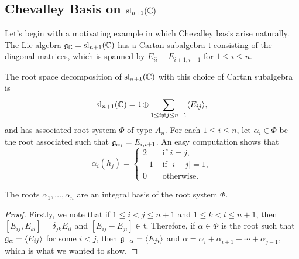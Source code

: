 \iffalse\begin{theorem}[Chevalley, 1955]
    Let $\fg_\CC$ be a complex simple Lie algebra. Then $\fg_\CC$ has a Chevalley basis. Moreover, the structure constants of any Chevalley basis are integral.
\end{theorem}\fi












\subsection{Chevalley Basis on \texorpdfstring{$\mathrm{sl}_{n+1}(\mathbb{C})$}{PDFstring}}\label{sec:chevbasis_sl}

Let's begin with a motivating example in which Chevalley basis arise naturally. The Lie algebra $\mathfrak{g}_{\mathbb{C}}=\mathrm{sl}_{n+1}(\mathbb{C})$ has a Cartan subalgebra $\mathfrak{t}$ consisting of the diagonal matrices, which is spanned by $E_{ii}-E_{i+1,i+1}$ for $1\leq i\leq n$. %

The root space decomposition of $\mathrm{sl}_{n+1}(\mathbb{C})$ with this choice of Cartan subalgebra is 
$$\mathrm{sl}_{n+1}(\mathbb{C})=\mathfrak{t}\oplus\sum_{1\leq i\neq j\leq n+1}\langle E_{ij}\rangle,$$
and has associated root system $\Phi$ of type $A_n$. For each $1\leq i\leq n$, let $\alpha_i\in\Phi$ be the root associated such that $\mathfrak{g}_{\alpha_i}=E_{i,i+1}$. An easy computation shows that 
$$\alpha_i(h_j)=\begin{cases}
    2 & \text{ if } i=j,\\
    -1 & \text{ if } |i-j|=1,\\
    0 & \text{ otherwise.}
\end{cases}$$

\begin{lemma}
    The roots $\alpha_1,\ldots,\alpha_n$ are an integral basis of the root system $\Phi$.
\end{lemma}
\begin{proof}
    Firstly, we note that if $1\leq i<j\leq n+1$ and $1\leq k<l\leq n+1$, then $[E_{ij},E_{kl}]=\delta_{jk}E_{il}$ and $[E_{ij}-E_{ji}]\in\mathfrak{t}$. Therefore, if $\alpha\in\Phi$ is the root such that $\mathfrak{g}_\alpha=\langle E_{ij}\rangle$ for some $i<j$, then $\mathfrak{g}_{-\alpha}=\langle E_{ji}\rangle$ and $\alpha=\alpha_i+\alpha_{i+1}+\cdots+\alpha_{j-1}$, which is what we wanted to show.
\end{proof}

